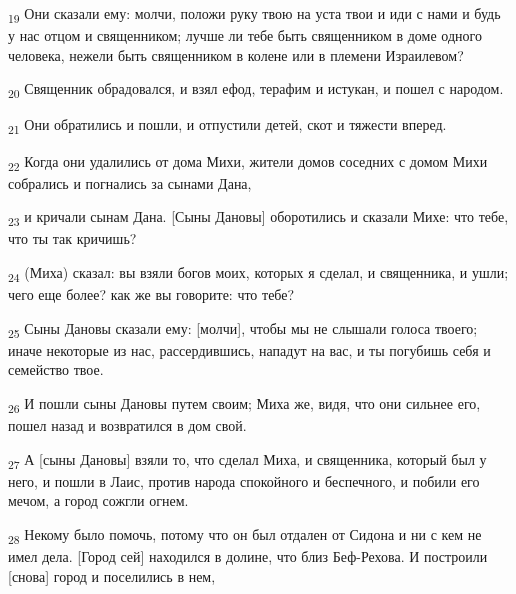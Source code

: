 \begin{tcolorbox}
\textsubscript{19} Они сказали ему: молчи, положи руку твою на уста твои и иди с нами и будь у нас отцом и священником; лучше ли тебе быть священником в доме одного человека, нежели быть священником в колене или в племени Израилевом?
\end{tcolorbox}
\begin{tcolorbox}
\textsubscript{20} Священник обрадовался, и взял ефод, терафим и истукан, и пошел с народом.
\end{tcolorbox}
\begin{tcolorbox}
\textsubscript{21} Они обратились и пошли, и отпустили детей, скот и тяжести вперед.
\end{tcolorbox}
\begin{tcolorbox}
\textsubscript{22} Когда они удалились от дома Михи, жители домов соседних с домом Михи собрались и погнались за сынами Дана,
\end{tcolorbox}
\begin{tcolorbox}
\textsubscript{23} и кричали сынам Дана. [Сыны Дановы] оборотились и сказали Михе: что тебе, что ты так кричишь?
\end{tcolorbox}
\begin{tcolorbox}
\textsubscript{24} (Миха) сказал: вы взяли богов моих, которых я сделал, и священника, и ушли; чего еще более? как же вы говорите: что тебе?
\end{tcolorbox}
\begin{tcolorbox}
\textsubscript{25} Сыны Дановы сказали ему: [молчи], чтобы мы не слышали голоса твоего; иначе некоторые из нас, рассердившись, нападут на вас, и ты погубишь себя и семейство твое.
\end{tcolorbox}
\begin{tcolorbox}
\textsubscript{26} И пошли сыны Дановы путем своим; Миха же, видя, что они сильнее его, пошел назад и возвратился в дом свой.
\end{tcolorbox}
\begin{tcolorbox}
\textsubscript{27} А [сыны Дановы] взяли то, что сделал Миха, и священника, который был у него, и пошли в Лаис, против народа спокойного и беспечного, и побили его мечом, а город сожгли огнем.
\end{tcolorbox}
\begin{tcolorbox}
\textsubscript{28} Некому было помочь, потому что он был отдален от Сидона и ни с кем не имел дела. [Город сей] находился в долине, что близ Беф-Рехова. И построили [снова] город и поселились в нем,
\end{tcolorbox}
